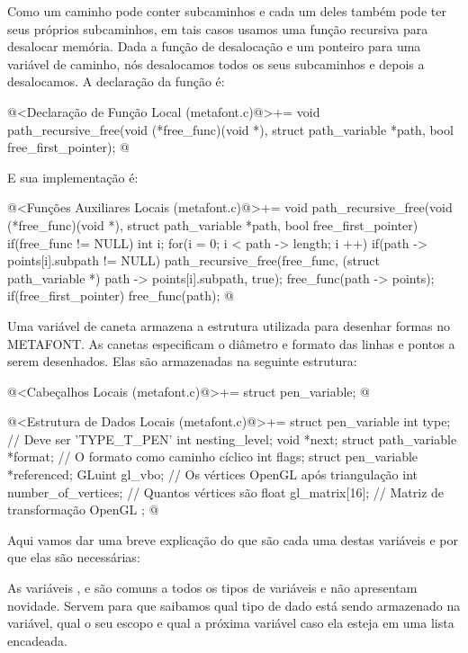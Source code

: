 Como um caminho pode conter subcaminhos e cada um deles também pode
ter seus próprios subcaminhos, em tais casos usamos uma função
recursiva para desalocar memória. Dada a função de desalocação e um
ponteiro para uma variável de caminho, nós desalocamos todos os seus
subcaminhos e depois a desalocamos. A declaração da função é:

\iniciocodigo
@<Declaração de Função Local (metafont.c)@>+=
void path_recursive_free(void (*free_func)(void *),
                         struct path_variable *path,
                         bool free_first_pointer);
@
\fimcodigo

E sua implementação é:

\iniciocodigo
@<Funções Auxiliares Locais (metafont.c)@>+=
void path_recursive_free(void (*free_func)(void *),
                         struct path_variable *path,
                         bool free_first_pointer){
  if(free_func != NULL){
    int i;
    for(i = 0; i < path -> length; i ++){
      if(path -> points[i].subpath != NULL)
        path_recursive_free(free_func, (struct path_variable *)
                                       path -> points[i].subpath, true);
    }
    free_func(path -> points);
    if(free_first_pointer)
      free_func(path);
  }
}
@
\fimcodigo


Uma variável de caneta armazena a estrutura utilizada para desenhar
formas no METAFONT. As canetas especificam o diâmetro e formato das
linhas e pontos a serem desenhados. Elas são armazenadas na seguinte
estrutura:

\iniciocodigo
@<Cabeçalhos Locais (metafont.c)@>+=
struct pen_variable;
@
\fimcodigo

\iniciocodigo
@<Estrutura de Dados Locais (metafont.c)@>+=
struct pen_variable{
  int type; // Deve ser 'TYPE_T_PEN'
  int nesting_level;
  void *next;
  struct path_variable *format; // O formato como caminho cíclico
  int flags;
  struct pen_variable *referenced;
  GLuint gl_vbo; // Os vértices OpenGL após triangulação
  int number_of_vertices; // Quantos vértices são
  float gl_matrix[16]; // Matriz de transformação OpenGL
};
@
\fimcodigo

Aqui vamos dar uma breve explicação do que são cada uma destas
variáveis e por que elas são necessárias:

As variáveis , 
e  são comuns a todos os tipos de variáveis e não
apresentam novidade. Servem para que saibamos qual tipo de dado está
sendo armazenado na variável, qual o seu escopo e qual a próxima
variável caso ela esteja em uma lista encadeada.

